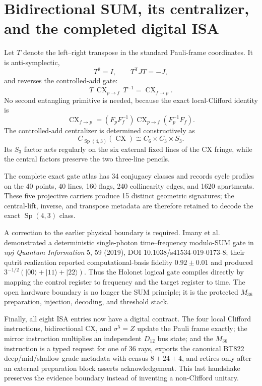 \providecommand{\Sp}{\operatorname{Sp}}
\section*{Bidirectional SUM, its centralizer, and the completed digital ISA}
Let \(T\) denote the left--right transpose in the standard Pauli-frame coordinates.
It is anti-symplectic,
\[
 T^2=I,\qquad T^{\mathsf T}JT=-J,
\]
and reverses the controlled-add gate:
\[
 T\,\operatorname{CX}_{p\to f}\,T^{-1}=\operatorname{CX}_{f\to p}.
\]
No second entangling primitive is needed, because the exact local-Clifford identity is
\[
 \operatorname{CX}_{f\to p}
 =(F_pF_f^{-1})\operatorname{CX}_{p\to f}(F_p^{-1}F_f).
\]
The controlled-add centralizer is determined constructively as
\[
 C_{\Sp(4,3)}(\operatorname{CX})\cong C_6\times C_3\times S_3.
\]
Its \(S_3\) factor acts regularly on the six external fixed lines of the CX fringe,
while the central factors preserve the two three-line pencils.

The complete exact gate atlas has 34 conjugacy classes and records cycle profiles on the
40 points, 40 lines, 160 flags, 240 collinearity edges, and 1620 apartments. These five
projective carriers produce 15 distinct geometric signatures; the central-lift,
inverse, and transpose metadata are therefore retained to decode the exact
\(\Sp(4,3)\) class.

A correction to the earlier physical boundary is required. Imany et al. demonstrated a
deterministic single-photon time--frequency modulo-SUM gate in
\emph{npj Quantum Information} 5, 59 (2019), DOI 10.1038/s41534-019-0173-8; their qutrit realization reported computational-basis fidelity
\(0.92\pm0.01\) and produced
\(3^{-1/2}(|00\rangle+|11\rangle+|22\rangle)\). Thus the Holonet logical gate compiles
directly by mapping the control register to frequency and the target register to time.
The open hardware boundary is no longer the SUM principle; it is the protected
\(M_{36}\) preparation, injection, decoding, and threshold stack.

Finally, all eight ISA entries now have a digital contract. The four local Clifford
instructions, bidirectional CX, and \(\sigma^5=Z\) update the Pauli frame exactly; the
mirror instruction multiplies an independent \(D_{12}\) bus state; and the
\(M_{36}\) instruction is a typed request for one of 36 rays, exports the canonical
BT822 deep/mid/shallow grade metadata with census \(8+24+4\), and retires only after an
external preparation block asserts acknowledgement. This last handshake preserves the
evidence boundary instead of inventing a non-Clifford unitary.
